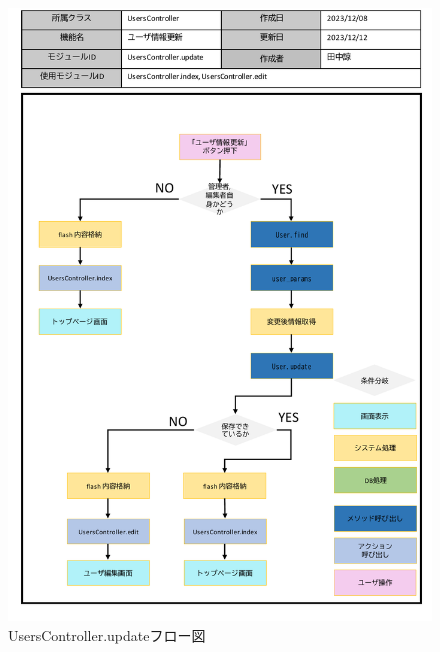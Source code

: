 \begin{figure}
	\centering
	\includegraphics[scale=0.6]{img/Users/pptx/UsersController_update.pdf}
	\caption{UsersController.updateフロー図}
\end{figure}

\clearpage

